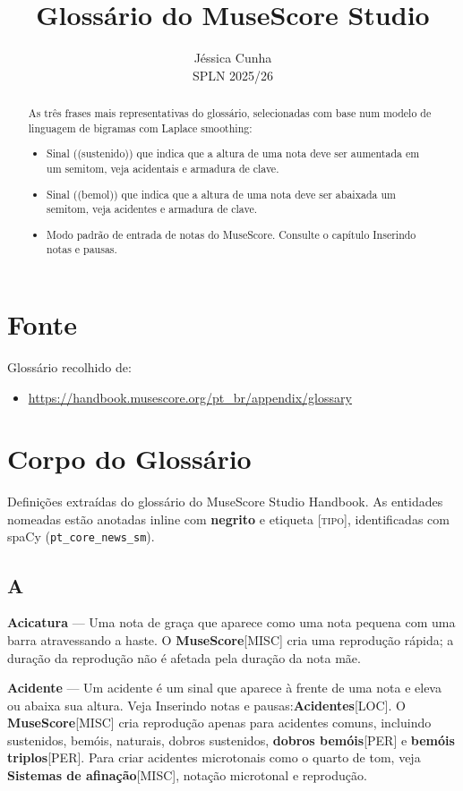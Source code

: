 \documentclass[a4paper,12pt]{article}
\title{Glossário do MuseScore Studio}
\author{Jéssica Cunha \\ SPLN 2025/26}
\date{}
\begin{document}
\maketitle

\begin{abstract}
As três frases mais representativas do glossário, selecionadas com base
num modelo de linguagem de bigramas com Laplace smoothing:

\begin{itemize}
  \item Sinal ((sustenido)) que indica que a altura de uma nota deve ser aumentada em um semitom, veja acidentais e armadura de clave.
  \item Sinal ((bemol)) que indica que a altura de uma nota deve ser abaixada um semitom, veja acidentes e armadura de clave.
  \item Modo padrão de entrada de notas do MuseScore. Consulte o capítulo Inserindo notas e pausas.
\end{itemize}
\end{abstract}

\section{Fonte}
Glossário recolhido de:
\begin{itemize}
  \item \url{https://handbook.musescore.org/pt_br/appendix/glossary}
\end{itemize}

\section{Corpo do Glossário}
Definições extraídas do glossário do MuseScore Studio Handbook.
As entidades nomeadas estão anotadas inline com \textbf{negrito}
e etiqueta \textsc{[tipo]}, identificadas com spaCy (\texttt{pt\_core\_news\_sm}).

\subsection*{A}
\textbf{Acicatura} --- Uma nota de graça que aparece como uma nota pequena com uma barra atravessando a haste. O \textbf{MuseScore}\textsc{[MISC]} cria uma reprodução rápida; a duração da reprodução não é afetada pela duração da nota mãe.

\textbf{Acidente} --- Um acidente é um sinal que aparece à frente de uma nota e eleva ou abaixa sua altura. Veja Inserindo notas e pausas:\textbf{Acidentes}\textsc{[LOC]}. O \textbf{MuseScore}\textsc{[MISC]} cria reprodução apenas para acidentes comuns, incluindo sustenidos, bemóis, naturais, dobros sustenidos, \textbf{dobros bemóis}\textsc{[PER]} e \textbf{bemóis triplos}\textsc{[PER]}. Para criar acidentes microtonais como o quarto de tom, veja \textbf{Sistemas de afinação}\textsc{[MISC]}, notação microtonal e reprodução.
\end{document}
